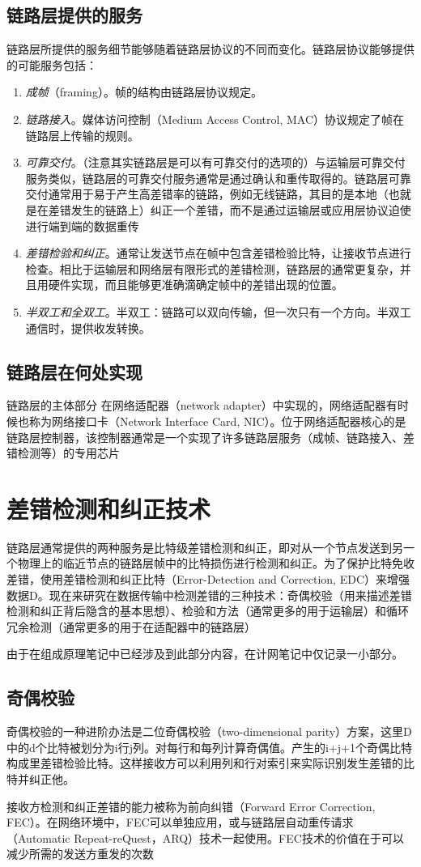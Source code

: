 \documentclass[]{report}
\newcommand{\myCoral}{\color[HTML]{FF7F50}} %
\begin{document}
		\subsection{链路层提供的服务}
		链路层所提供的服务细节能够随着链路层协议的不同而变化。链路层协议能够提供的可能服务包括：
		\begin{enumerate}
			\item \textit{成帧}（framing）。帧的结构由链路层协议规定。
			\item \textit{链路接入}。媒体访问控制（Medium Access Control, MAC）协议规定了帧在链路层上传输的规则。
			\item \textit{可靠交付}。{\myCoral （注意其实链路层是可以有可靠交付的选项的）}与运输层可靠交付服务类似，链路层的可靠交付服务通常是通过确认和重传取得的。链路层可靠交付通常用于易于产生高差错率的链路，例如无线链路，其目的是本地（也就是在差错发生的链路上）纠正一个差错，而不是通过运输层或应用层协议迫使进行端到端的数据重传
			\item \textit{差错检验和纠正}。通常让发送节点在帧中包含差错检验比特，让接收节点进行检查。相比于运输层和网络层有限形式的差错检测，链路层的通常更复杂，并且用硬件实现，而且能够更准确滴确定帧中的差错出现的位置。
			\item \textit{半双工和全双工}。半双工：链路可以双向传输，但一次只有一个方向。半双工通信时，提供收发转换。
		\end{enumerate}
		\subsection{链路层在何处实现}
		链路层的主体部分 在网络适配器（network adapter）中实现的，网络适配器有时候也称为网络接口卡（Network Interface Card, NIC）。位于网络适配器核心的是链路层控制器，该控制器通常是一个实现了许多链路层服务（成帧、链路接入、差错检测等）的专用芯片
	\section{差错检测和纠正技术}
	链路层通常提供的两种服务是比特级差错检测和纠正，即对从一个节点发送到另一个物理上的临近节点的链路层帧中的比特损伤进行检测和纠正。为了保护比特免收差错，使用差错检测和纠正比特（Error-Detection and Correction, EDC）来增强数据D。现在来研究在数据传输中检测差错的三种技术：奇偶校验（用来描述差错检测和纠正背后隐含的基本思想）、检验和方法（通常更多的用于运输层）和循环冗余检测（通常更多的用于在适配器中的链路层）\par
	由于在组成原理笔记中已经涉及到此部分内容，在计网笔记中仅记录一小部分。
		\subsection{奇偶校验}
		奇偶校验的一种进阶办法是二位奇偶校验（two-dimensional parity）方案，这里D中的d个比特被划分为i行j列。对每行和每列计算奇偶值。产生的i+j+1个奇偶比特构成里差错检验比特。这样接收方可以利用列和行对索引来实际识别发生差错的比特并纠正他。\par
		接收方检测和纠正差错的能力被称为前向纠错（Forward Error Correction, FEC）。在网络环境中，FEC可以单独应用，或与链路层自动重传请求（Automatic Repeat-reQuest，ARQ）技术一起使用。FEC技术的价值在于可以减少所需的发送方重发的次数
\end{document}
